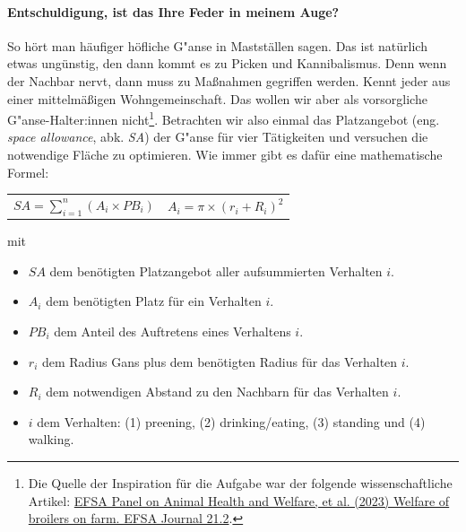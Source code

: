 \documentclass[a4paper, 9pt]{scrartcl}\usepackage[]{graphicx}\usepackage[]{xcolor}
\begin{document}
\paragraph{Entschuldigung, ist das Ihre Feder in meinem Auge?}



So h{\"o}rt man h{\"a}ufiger h{\"o}fliche G{"a}nse in Mastst{\"a}llen sagen. Das
ist nat{\"u}rlich etwas ung{\"u}nstig, den dann kommt es zu Picken und
Kannibalismus. Denn wenn der Nachbar nervt, dann muss zu Ma{\ss}nahmen
gegriffen werden. Kennt jeder aus einer mittelm{\"a}{\ss}igen Wohngemeinschaft. Das
wollen wir aber als vorsorgliche G{"a}nse-Halter:innen
nicht\footnote{Die Quelle der Inspiration f{\"u}r die Aufgabe war der folgende
  wissenschaftliche Artikel:
  \href{https://www.efsa.europa.eu/en/efsajournal/pub/7788}{EFSA Panel on
    Animal Health and Welfare, et al. (2023) Welfare of broilers on
    farm. EFSA Journal 21.2}.}. Betrachten wir also einmal das Platzangebot
(eng. \textit{space allowance}, abk. \textit{SA}) der G{"a}nse
f{\"u}r vier T{\"a}tigkeiten und versuchen die notwendige Fl{\"a}che zu optimieren. Wie
immer gibt es daf{\"u}r eine mathematische Formel:


\begin{center}
  \begin{tabular}{cc}
    $SA = \sum^n_{i = 1} (A_i \times PB_i)$ & $A_i = \pi \times (r_i + R_i)^2$\\
  \end{tabular}
\end{center}

\vspace{-2Ex}

mit

\begin{itemize}[noitemsep]
\item $SA$ dem ben{\"o}tigten Platzangebot aller aufsummierten Verhalten $i$.
\item $A_i$ dem ben{\"o}tigten Platz f{\"u}r ein Verhalten $i$. 
\item $PB_i$ dem Anteil des Auftretens eines Verhaltens $i$.
\item $r_i$ dem Radius Gans plus dem ben{\"o}tigten Radius f{\"u}r das Verhalten $i$.
\item $R_i$ dem notwendigen Abstand zu den Nachbarn f{\"u}r das Verhalten $i$.    
\item $i$ dem Verhalten: (1) preening, (2) drinking/eating, (3)
  standing und (4) walking.
\end{itemize}
\end{document}
